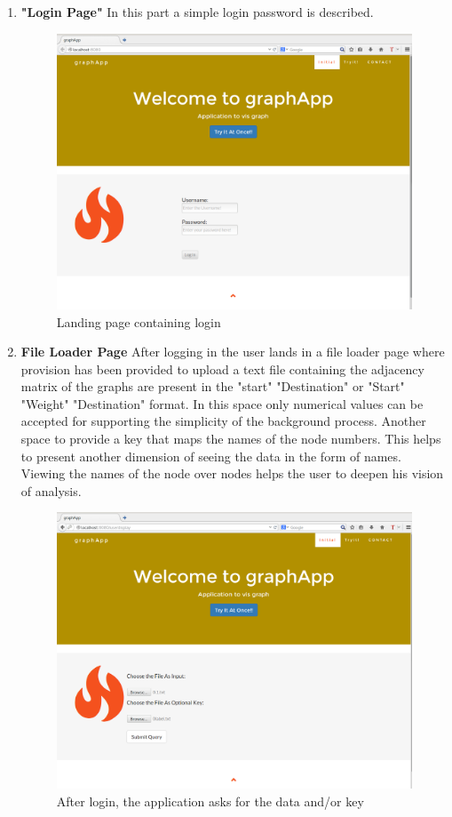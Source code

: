 \begin{enumerate}
\item \textbf{"Login Page"} In this part a simple login password is described.  
\begin{figure}[H]
\centering
\includegraphics[scale=0.3]{s1.png}
\caption{Landing page containing login}
\end{figure}

\item \textbf{File Loader Page} After logging in the user lands in a file loader page where provision has been provided to upload a text file containing the adjacency matrix of the graphs are present in the "start" "Destination" or "Start" "Weight" "Destination" format. In this space only numerical values can be accepted for supporting the simplicity of the background process. Another space to provide a key that maps the names of the node numbers. This helps to present another dimension of seeing the data in the form of names.  Viewing the names of the node over nodes helps the user to deepen his vision of analysis. 
\begin{figure}[H]
\centering
\includegraphics[scale=0.3]{s3.png}
\caption{After login, the application asks for the data and/or key }
\end{figure}



\end{enumerate}
